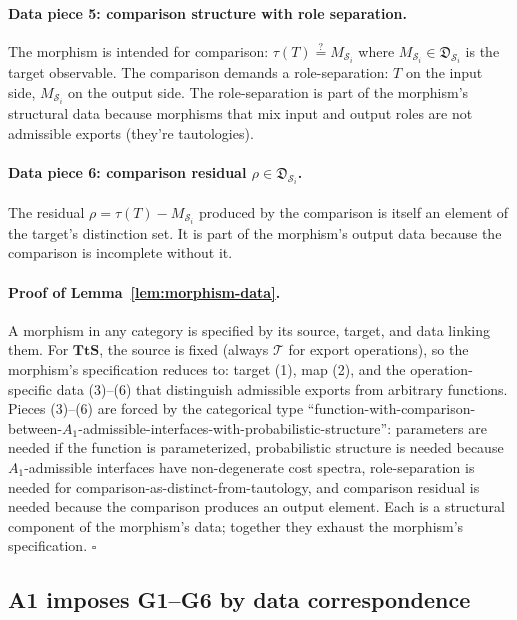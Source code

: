 \paragraph{Data piece 5: comparison structure with role separation.} The morphism is intended for comparison: $\tau(T) \stackrel{?}{=} M_{\mathcal{S}_i}$ where $M_{\mathcal{S}_i} \in \mathfrak{D}_{\mathcal{S}_i}$ is the target observable. The comparison demands a role-separation: $T$ on the input side, $M_{\mathcal{S}_i}$ on the output side. The role-separation is part of the morphism's structural data because morphisms that mix input and output roles are not admissible exports (they're tautologies).

\paragraph{Data piece 6: comparison residual $\rho \in \mathfrak{D}_{\mathcal{S}_i}$.} The residual $\rho = \tau(T) - M_{\mathcal{S}_i}$ produced by the comparison is itself an element of the target's distinction set. It is part of the morphism's output data because the comparison is incomplete without it.

\paragraph{Proof of Lemma~\ref{lem:morphism-data}.} A morphism in any category is specified by its source, target, and data linking them. For $\mathbf{TtS}$, the source is fixed (always $\mathcal{T}$ for export operations), so the morphism's specification reduces to: target (1), map (2), and the operation-specific data (3)--(6) that distinguish admissible exports from arbitrary functions. Pieces (3)--(6) are forced by the categorical type ``function-with-comparison-between-$A_1$-admissible-interfaces-with-probabilistic-structure'': parameters are needed if the function is parameterized, probabilistic structure is needed because $A_1$-admissible interfaces have non-degenerate cost spectra, role-separation is needed for comparison-as-distinct-from-tautology, and comparison residual is needed because the comparison produces an output element. Each is a structural component of the morphism's data; together they exhaust the morphism's specification. $\square$

\subsection{A1 imposes G1--G6 by data correspondence}
\label{subsec:A1-correspondence}


